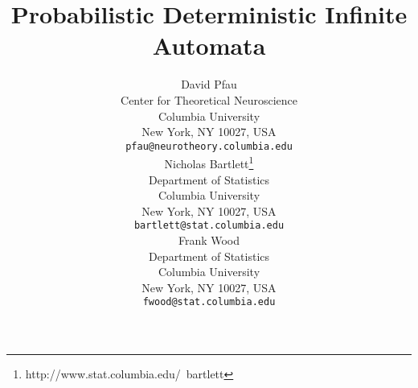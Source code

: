 \documentclass{article}
\title{Probabilistic Deterministic Infinite Automata}
\author{
David Pfau \\
Center for Theoretical Neuroscience \\
Columbia University\\
New York, NY 10027, USA \\
\texttt{pfau@neurotheory.columbia.edu} \\
\AND
Nicholas Bartlett\thanks{ http://www.stat.columbia.edu/~bartlett} \\
Department of Statistics\\
Columbia University\\
New York, NY 10027, USA \\
\texttt{bartlett@stat.columbia.edu} \\
\And
Frank Wood \\
Department of Statistics\\
Columbia University\\
New York, NY 10027, USA \\
\texttt{fwood@stat.columbia.edu} \\
}
\begin{document}
\maketitle








%


%







\begin{small}

 
%
\end{small}
\end{document}
